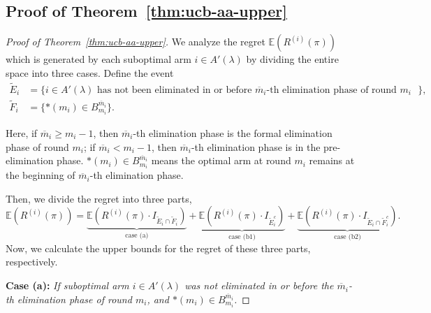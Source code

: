 \documentclass[11pt]{article}
\begin{document}
\subsection{Proof of Theorem~\ref{thm:ucb-aa-upper}}
\label{sec:Proof of thm:ucb-aa-upper}
\begin{proof}[Proof of Theorem~\ref{thm:ucb-aa-upper}]
 We analyze the regret $\mathbb{E}(R^{(i)}(\pi)) $ which is generated by each suboptimal arm $i\in A'(\lambda)$ by dividing the entire space into three cases. Define the event 
\begin{align*}
    \tilde{E}_i&=\{ i\in A'(\lambda) \text{ has not been eliminated in or before $\overline{m}_i$-th elimination phase of round $m_i$ }  \}, \\
    \tilde{F}_i&=\{ *(m_i) \in B_{m_i}^{\overline{m}_i} \}.
\end{align*}

Here, if $\overline{m}_i\geq m_i-1$, then $\overline{m}_i$-th elimination phase is the formal elimination phase of round $m_i$; if $\overline{m}_i< m_i-1$, then $\overline{m}_i$-th elimination phase is in the pre-elimination phase. $*(m_i)\in B_{m_i}^{\overline{m}_i}$ means the optimal arm at round $m_i$ remains at the beginning of $\overline{m}_i$-th elimination phase.

Then, we divide the regret into three parts, 
\[\mathbb{E}(R^{(i)}(\pi)) = \underbrace{\mathbb{E}\left(R^{(i)}(\pi)\cdot I_{\tilde{E}_i\cap \tilde{F}_i}\right)}_{\text{case (a)}} + \underbrace{\mathbb{E}\left(R^{(i)}(\pi)\cdot I_{\tilde{E}_i^c}\right)}_{\text{case (b1)}} + \underbrace{\mathbb{E}\left(R^{(i)}(\pi)\cdot I_{\tilde{E}_i\cap\tilde{F}_i^c}\right)}_{\text{case (b2)}}.\]
Now, we calculate the upper bounds for the regret of these three parts, respectively.

\textbf{Case (a):} \textit{ If suboptimal arm $i\in A'(\lambda)$ was not eliminated in or before the $\overline{m}_i$-th elimination phase of round $m_i$, and $*(m_i)\in B_{m_i}^{\overline{m}_i}$. }


\end{proof}
\end{document}
